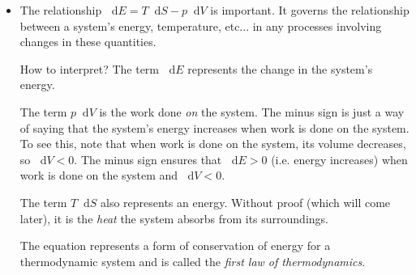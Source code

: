 \documentclass[11pt, a4paper]{article}
\newcommand{\diff}{\mathop{}\!\mathrm{d}} %
\begin{document}
\begin{itemize}
	\item The relationship $ \diff E = T\diff S - p \diff V $ is important. It governs the relationship between a system's energy, temperature, etc... in any processes involving changes in these quantities.
	
	How to interpret? The term $ \diff E $ represents the change in the system's energy. 
	
	The term $ p \diff V $ is the work done \textit{on} the system. The minus sign is just a way of saying that the system's energy increases when work is done on the system. To see this, note that when work is done on the system, its volume decreases, so $ \diff V < 0 $. The minus sign ensures that $ \diff E > 0 $ (i.e. energy increases) when work is done on the system and $ \diff V < 0 $. 
	
	The term $ T \diff S $ also represents an energy. Without proof (which will come later), it is the \textit{heat} the system absorbs from its surroundings. 
	
	The equation represents a form of conservation of energy for a thermodynamic system and is called the \textit{first law of thermodynamics}.

\end{itemize}
\end{document}
